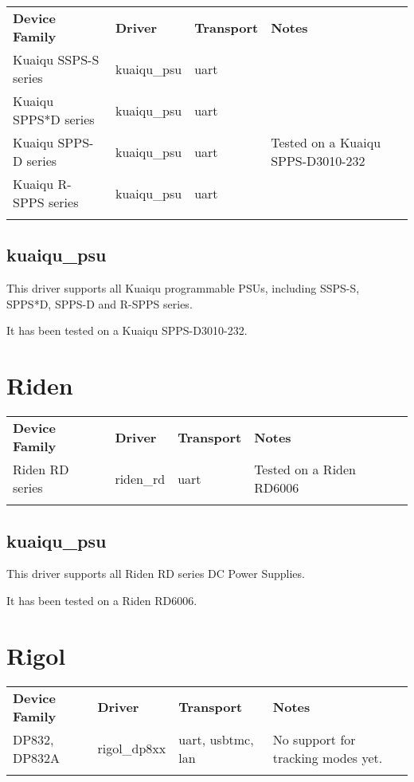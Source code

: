 \begin{tabularx}{16cm}{lllX}
\thickhline
\textbf{Device Family} & \textbf{Driver} & \textbf{Transport} & \textbf{Notes} \\
\thickhline
Kuaiqu SSPS-S series & kuaiqu\_psu & uart & \\
Kuaiqu SPPS*D series & kuaiqu\_psu & uart & \\
Kuaiqu SPPS-D series & kuaiqu\_psu & uart & Tested on a Kuaiqu SPPS-D3010-232\\
Kuaiqu R-SPPS series & kuaiqu\_psu & uart & \\
\thickhline
\end{tabularx}

\subsection{kuaiqu\_psu}

This driver supports all Kuaiqu programmable PSUs, including SSPS-S, SPPS*D, SPPS-D and R-SPPS series.

It has been tested on a Kuaiqu SPPS-D3010-232.

\section{Riden}

\begin{tabularx}{16cm}{lllX}
\thickhline
\textbf{Device Family} & \textbf{Driver} & \textbf{Transport} & \textbf{Notes} \\
\thickhline
Riden RD series & riden\_rd & uart & Tested on a Riden RD6006\\
\thickhline
\end{tabularx}

\subsection{kuaiqu\_psu}

This driver supports all Riden RD series DC Power Supplies.

It has been tested on a Riden RD6006.

\section{Rigol}

\begin{tabularx}{16cm}{lllX}
\thickhline
\textbf{Device Family} & \textbf{Driver} & \textbf{Transport} & \textbf{Notes} \\
\thickhline
DP832, DP832A & rigol\_dp8xx & uart, usbtmc, lan & No support for tracking modes yet.\\
\thickhline
\end{tabularx}

